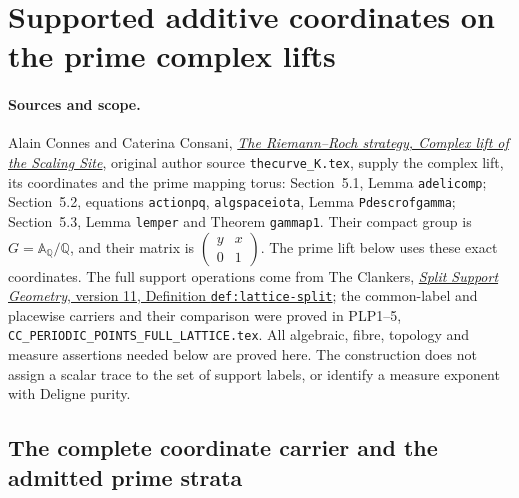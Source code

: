 \section{Supported additive coordinates on the prime complex lifts}
\label{sec:supported-prime-complex-lift}

\paragraph{Sources and scope.}
Alain Connes and Caterina Consani,
\href{https://arxiv.org/abs/1805.10501v1}{\emph{The Riemann--Roch strategy,
Complex lift of the Scaling Site}}, original author source
\nolinkurl{thecurve_K.tex}, supply the complex lift, its coordinates and
the prime mapping torus: Section~5.1, Lemma \texttt{adelicomp};
Section~5.2, equations \texttt{actionpq}, \texttt{algspaceiota}, Lemma
\texttt{Pdescrofgamma}; Section~5.3, Lemma \texttt{lemper} and Theorem
\texttt{gammap1}. Their compact group is $G=\mathbb A_{\mathbb Q}/\mathbb Q$,
and their matrix is $\left(\begin{smallmatrix}y&x\\0&1\end{smallmatrix}\right)$.
The prime lift below uses these exact coordinates. The full support
operations come from The Clankers,
\href{https://github.com/KokunoYumeto/zeta-function-research-reader/blob/a2851f9eb352e7e4376bc629de86fa4ed9c1c434/workbenches/splitzero-tandem/foundations/split-support-geometry-v11/split_support_geometry_arithmetic_curve_v11.tex#L1226}
{\emph{Split Support Geometry}, version 11, Definition \texttt{def:lattice-split}};
the common-label and placewise carriers and their comparison were proved
in PLP1--5, \nolinkurl{CC_PERIODIC_POINTS_FULL_LATTICE.tex}.
All algebraic, fibre, topology and measure assertions needed below are
proved here. The construction does not assign a scalar trace to the set
of support labels, or identify a measure exponent with Deligne purity.

\subsection{The complete coordinate carrier and the admitted prime strata}

